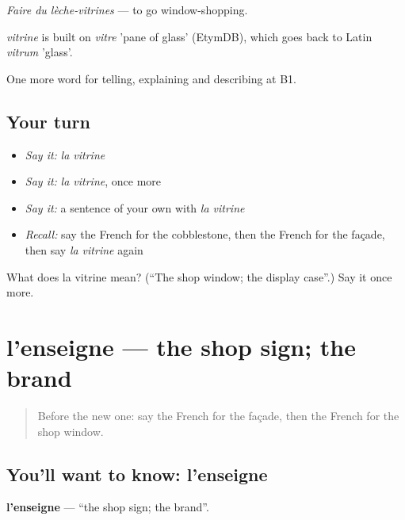 \emph{Faire du lèche-vitrines} — to go window-shopping.

\begin{cousinweb}
\emph{vitrine} is built on \emph{vitre} 'pane of glass' (EtymDB), which goes back to Latin \emph{vitrum} 'glass'.
\end{cousinweb}

\begin{grammarlens}[title={What you've built}]
One more word for telling, explaining and describing at B1.
\end{grammarlens}

\subsection*{Your turn}
\begin{itemize}
\raggedright
  \item \emph{Say it:} \emph{la vitrine}
  \item \emph{Say it:} \emph{la vitrine}, once more
  \item \emph{Say it:} a sentence of your own with \emph{la vitrine}
  \item \emph{Recall:} say the French for the cobblestone, then the French for the façade, then say \emph{la vitrine} again
\end{itemize}

\begin{tcolorbox}[breakable,colback=teal!4,colframe=teal!35!black,title={Before you move on}]
What does la vitrine mean? (\textquotedblleft{}The shop window; the display case\textquotedblright{}.) Say it once more.
\end{tcolorbox}
\section[l'enseigne]{l'enseigne — the shop sign; the brand}

\label{lesson:FR-C442-enseigne}



\begin{quote}
Before the new one: say the French for the façade, then the French for the shop window.
\end{quote}

\subsection*{You'll want to know: l'enseigne}
\textbf{l'enseigne} — \textquotedblleft{}the shop sign; the brand\textquotedblright{}.

